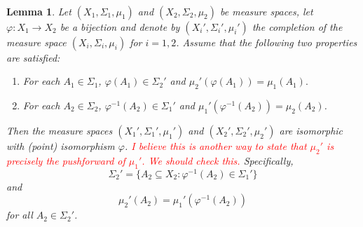 \documentclass[11pt]{article}
\theoremstyle{theorem}
\newtheorem{lemma}[theorem]{Lemma}
\begin{document}
\
\begin{lemma}\label{lem:PushforwardLemma}
Let $(X_1,\Sigma_1,\mu_1)$ and $(X_2,\Sigma_2,\mu_2)$ be measure spaces, let $\varphi:X_1\to X_2$ be a bijection and denote by $(X_i',\Sigma_i',\mu_i')$ the completion of the measure space $(X_i,\Sigma_i,\mu_i)$ for $i=1,2$. Assume that the following two properties are satisfied:
\begin{enumerate}
\item\label{property:PushforwardLemma1} For each $A_1\in\Sigma_1$, $\varphi(A_1)\in\Sigma_2'$ and $\mu_2'(\varphi(A_1))=\mu_1(A_1).$
\item\label{property:PushforwardLemma2} For each $A_2\in\Sigma_2$, $\varphi^{-1}(A_2)\in \Sigma_1'$ and $\mu_1'(\varphi^{-1}(A_2))=\mu_2(A_2)$.
\end{enumerate}
Then the measure spaces $(X_1',\Sigma_1',\mu_1')$ and $(X_2',\Sigma_2',\mu_2')$ are isomorphic with (point) isomorphism $\varphi$. \textcolor{red}{I believe this is another way to state that $\mu_2'$ is precisely the pushforward of $\mu_1'$. We should check this.} Specifically,
\begin{equation}\label{eq:PushforwardLemma1}
\Sigma_2'=\{A_2\subseteq X_2: \varphi^{-1}(A_2)\in\Sigma_1'\}
\end{equation}
and
\begin{equation}\label{eq:PushforwardLemma2}
\mu_2'(A_2)=\mu_1'(\varphi^{-1}(A_2))
\end{equation}
for all $A_2\in\Sigma_2'$.
\end{lemma}
\end{document}
